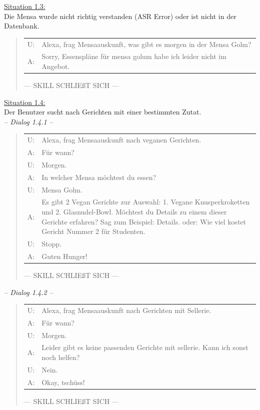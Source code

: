 \documentclass[12pt]{article}
\begin{document}
\ul{Situation 1.3:}\\Die Mensa wurde nicht richtig verstanden (ASR Error) oder ist nicht in der Datenbank.

\begin{quote}
\begin{tabular}{lp{12cm}}
	U:& Alexa, frag Mensaauskunft, was gibt es morgen in der Mensa Golm?\\
	A:& Sorry, Essenspläne für mensa golum habe ich leider nicht im Angebot.\\[0.2cm]
\end{tabular}
--- SKILL SCHLIEßT SICH ---\\
\end{quote}

\ul{Situation 1.4:}\\Der Benutzer sucht nach Gerichten mit einer bestimmten Zutat.\\
\emph{-- Dialog 1.4.1 --}
\begin{quote}
\begin{tabular}{lp{12cm}}
	U:& Alexa, frag Mensaauskunft nach veganen Gerichten.\\
	A:& Für wann?\\
	U:& Morgen.\\
	A:& In welcher Mensa möchtest du essen?\\
	U:& Mensa Golm.\\
	A:& Es gibt 2 Vegan Gerichte zur Auswahl: 1. Vegane Knusperkroketten und 2. Glasnudel-Bowl. Möchtest du Details zu einem dieser Gerichte erfahren? Sag zum Beispiel: Details. oder: Wie viel kostet Gericht Nummer 2 für Studenten.\\
	U:& Stopp.\\
	A:& Guten Hunger!\\[0.2cm]
\end{tabular}
--- SKILL SCHLIEßT SICH ---\\
\end{quote}

\emph{-- Dialog 1.4.2 --}
\begin{quote}
\begin{tabular}{lp{12cm}}
	U:& Alexa, frag Mensaauskunft nach Gerichten mit Sellerie.\\
	A:& Für wann?\\
	U:& Morgen.\\
	A:& Leider gibt es keine passenden  Gerichte mit sellerie. Kann ich sonst noch helfen?\\
	U:& Nein.\\
	A:& Okay, tschüss!\\[0.2cm]
\end{tabular}
--- SKILL SCHLIEßT SICH ---\\
\end{quote}
\end{document}
